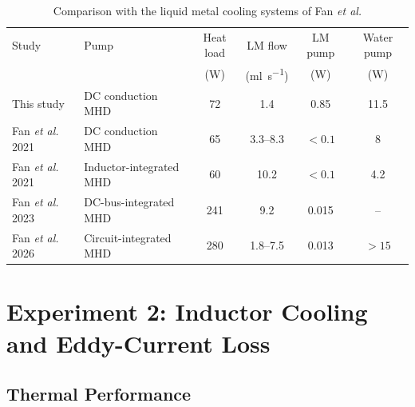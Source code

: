 \begin{table}[htbp]
  \centering
  \caption{Comparison with the liquid metal cooling systems of Fan \emph{et al.}}
  \label{tab:fan-comparison}
  \small
  \setlength{\tabcolsep}{4pt}
  \begin{tabularx}{\linewidth}{@{}>{\raggedright\arraybackslash}p{3.3cm}
      >{\raggedright\arraybackslash}X cccc@{}}
    \toprule
    Study & Pump & Heat load & LM flow & LM pump & Water pump \\
          &      & (\si{\watt}) & (\si{\milli\litre\per\second}) & (\si{\watt})
          & (\si{\watt}) \\
    \midrule
    This study & DC conduction MHD & 72 & 1.4 & 0.85 & 11.5\tnote{a} \\
    Fan \emph{et al.} 2021~\cite{fan_liquid_2021} & DC conduction MHD
      & 65 & 3.3--8.3 & $<0.1$ & 8\tnote{b} \\
    Fan \emph{et al.} 2021~\cite{fan_liquid_2021} & Inductor-integrated MHD
      & 60 & 10.2 & $<0.1$ & 4.2\tnote{c} \\
    Fan \emph{et al.} 2023~\cite{fan_high_2023} & DC-bus-integrated MHD
      & 241 & 9.2 & 0.015 & -- \\
    Fan \emph{et al.} 2026~\cite{fan_ultra-efficient_2026} & Circuit-integrated MHD
      & 280 & 1.8--7.5 & 0.013 & $>15$\tnote{d} \\
    \bottomrule
  \end{tabularx}
\end{table}

\section{Experiment 2: Inductor Cooling and Eddy-Current Loss}
\label{sec:results-exp2}

\subsection{Thermal Performance}
\label{sec:results-inductor-thermal}

